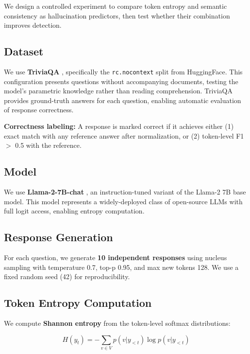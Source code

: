 We design a controlled experiment to compare token entropy and semantic consistency as hallucination predictors, then test whether their combination improves detection.

\subsection{Dataset}

We use \textbf{TriviaQA} \citep{joshi2017triviaqa}, specifically the \texttt{rc.nocontext} split from HuggingFace. This configuration presents questions without accompanying documents, testing the model's parametric knowledge rather than reading comprehension. TriviaQA provides ground-truth answers for each question, enabling automatic evaluation of response correctness.

\textbf{Correctness labeling:} A response is marked correct if it achieves either (1) exact match with any reference answer after normalization, or (2) token-level F1 $>$ 0.5 with the reference.

\subsection{Model}

We use \textbf{Llama-2-7B-chat} \citep{touvron2023llama}, an instruction-tuned variant of the Llama-2 7B base model. This model represents a widely-deployed class of open-source LLMs with full logit access, enabling entropy computation.

\subsection{Response Generation}

For each question, we generate \textbf{10 independent responses} using nucleus sampling with temperature 0.7, top-p 0.95, and max new tokens 128. We use a fixed random seed (42) for reproducibility.

\subsection{Token Entropy Computation}

We compute \textbf{Shannon entropy} from the token-level softmax distributions:

\begin{equation}
H(y_t) = -\sum_{v \in V} p(v | y_{<t}) \log p(v | y_{<t})
\end{equation}

